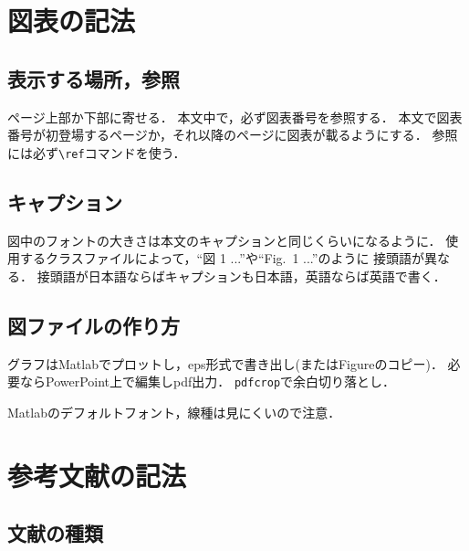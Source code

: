\documentclass[a4paper,10pt,twocolumn,dvipdfmx]{jsarticle}
\theoremstyle{definition}
\begin{document}
\section{図表の記法}
\subsection{表示する場所，参照}
ページ上部か下部に寄せる．
本文中で，必ず図表番号を参照する．
本文で図表番号が初登場するページか，それ以降のページに図表が載るようにする．
参照には必ず\verb!\ref!コマンドを使う．


\subsection{キャプション}
図中のフォントの大きさは本文のキャプションと同じくらいになるように．
使用するクラスファイルによって，``図 1 ...''や``Fig.~1 ...''のように
接頭語が異なる．
接頭語が日本語ならばキャプションも日本語，英語ならば英語で書く．

\subsection{図ファイルの作り方}%
グラフはMatlabでプロットし，eps形式で書き出し(またはFigureのコピー)．
必要ならPowerPoint上で編集しpdf出力．
\texttt{pdfcrop}で余白切り落とし．

Matlabのデフォルトフォント，線種は見にくいので注意．


\section{参考文献の記法}\label{sec:ref}
\subsection{文献の種類}
\end{document}
